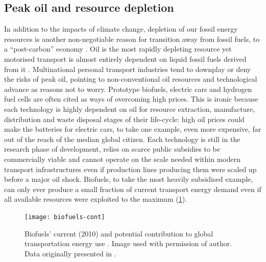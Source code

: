 \subsection{Peak oil and resource depletion}
In addition to the impacts of climate change,
depletion of our fossil energy resources is another non-negotiable
reason for transition away from fossil fuels, to a ``post-carbon'' economy
\citep{Heinberg2005, Heinberg2009, Heinberg2010, Kunstler2006}.
Oil is the most rapidly depleting resource yet motorised
transport is almost entirely dependent on liquid fossil fuels
derived from it \citep{Gilbert2008}.
Multinational personal transport industries tend to downplay or deny the risks
of peak oil, pointing to non-conventional oil resources and technological
advance as reasons not to worry. Prototype biofuels, electric cars and hydrogen
fuel cells are often cited as ways of overcoming high prices. This is ironic
because each technology is highly dependent on oil for resource extraction,
manufacture, distribution and waste disposal stages of their life-cycle: high
oil prices could make the batteries for electric cars, to take one example, even more
expensive, far out of the reach of the median global citizen.
Each technology is still in the research phase of development,
relies on scarce public subsidies to be commercially viable and cannot operate
on the scale needed within modern transport infrastructures even if production
lines producing them were scaled up before a major oil shock. Biofuels, to take
the most heavily subsidised example, can only ever produce a small fraction of
current transport energy demand even if all available resources were exploited
to the maximum (\cref{f:biofools}).

 \begin{figure}[htbp]
  \centerline{
    \texttt{[image: biofuels-cont]}}
  \caption[Biofuels' contribution to global transportation energy use]
{Biofuels' current (2010) and potential contribution to
global transportation energy use \citep[p.~228]{Aleklett2012-peeking}.
Image used with permission of author. Data originally presented in
\citet{Johansson2010-ag-fuel+food}.}
  \label{f:biofools}
\end{figure}


